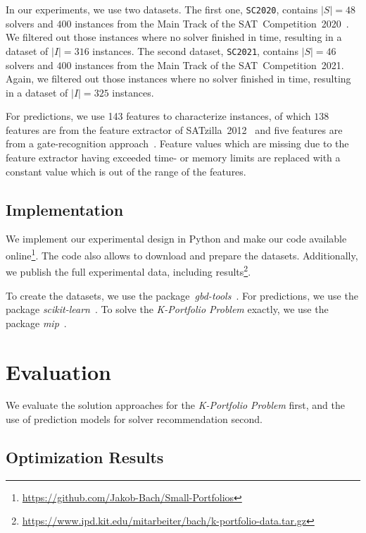\documentclass[conference]{IEEEtran}
\begin{document}
In our experiments, we use two datasets.
The first one, \texttt{SC2020}, contains $|S| = 48$ solvers and $400$ instances from the Main Track of the SAT~Competition~2020~\cite{balyo2020proceedings, SC2020:AIJ}.
We filtered out those instances where no solver finished in time, resulting in a dataset of $|I| = 316$ instances. 
The second dataset, \texttt{SC2021}, contains $|S| = 46$ solvers and $400$ instances from the Main Track of the SAT~Competition~2021.
Again, we filtered out those instances where no solver finished in time, resulting in a dataset of $|I| = 325$ instances.

For predictions, we use 143 features to characterize instances, of which $138$ features are from the feature extractor of SATzilla~2012~\cite{xu2008satzilla, xu2012satzilla2012} and five features are from a gate-recognition approach~\cite{Iser:2015:GateRecognition}. 
Feature values which are missing due to the feature extractor having exceeded time- or memory limits are replaced with a constant value which is out of the range of the features.

\subsection{Implementation}
\label{sec:impl}

We implement our experimental design in Python and make our code available online\footnote{\url{https://github.com/Jakob-Bach/Small-Portfolios}}.
The code also allows to download and prepare the datasets.
Additionally, we publish the full experimental data, including results\footnote{\url{https://www.ipd.kit.edu/mitarbeiter/bach/k-portfolio-data.tar.gz}}.

To create the datasets, we use the package~\emph{gbd-tools}~\cite{iser2020collaborative}.
For predictions, we use the package \emph{scikit-learn}~\cite{scikit-learn}.
To solve the \emph{K-Portfolio Problem} exactly, we use the package \emph{mip}~\cite{python-mip}.

\section{Evaluation}
\label{sec:evaluation}

We evaluate the solution approaches for the \emph{K-Portfolio Problem} first, and the use of prediction models for solver recommendation second.

\subsection{Optimization Results}
\end{document}
